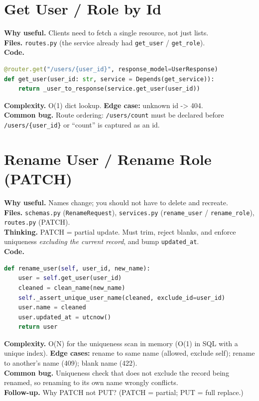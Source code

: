 \documentclass[11pt,a4paper]{report}
\begin{document}
\section{Get User / Role by Id}
\textbf{Why useful.} Clients need to fetch a single resource, not just lists.\\
\textbf{Files.} \texttt{routes.py} (the service already had \texttt{get\_user} /
\texttt{get\_role}).\\
\textbf{Code.}
\begin{lstlisting}[language=Python]
@router.get("/users/{user_id}", response_model=UserResponse)
def get_user(user_id: str, service = Depends(get_service)):
    return _user_to_response(service.get_user(user_id))
\end{lstlisting}
\textbf{Complexity.} O(1) dict lookup. \textbf{Edge case:} unknown id -> 404.\\
\textbf{Common bug.} Route ordering: \texttt{/users/count} must be declared before
\texttt{/users/\{user\_id\}} or ``count'' is captured as an id.

\section{Rename User / Rename Role (PATCH)}
\textbf{Why useful.} Names change; you should not have to delete and recreate.\\
\textbf{Files.} \texttt{schemas.py} (\texttt{RenameRequest}), \texttt{services.py}
(\texttt{rename\_user} / \texttt{rename\_role}), \texttt{routes.py} (PATCH).\\
\textbf{Thinking.} PATCH = partial update. Must trim, reject blanks, and enforce
uniqueness \emph{excluding the current record}, and bump \texttt{updated\_at}.\\
\textbf{Code.}
\begin{lstlisting}[language=Python]
def rename_user(self, user_id, new_name):
    user = self.get_user(user_id)
    cleaned = clean_name(new_name)
    self._assert_unique_user_name(cleaned, exclude_id=user_id)
    user.name = cleaned
    user.updated_at = utcnow()
    return user
\end{lstlisting}
\textbf{Complexity.} O(N) for the uniqueness scan in memory (O(1) in SQL with a
unique index). \textbf{Edge cases:} rename to same name (allowed, exclude self);
rename to another's name (409); blank name (422).\\
\textbf{Common bug.} Uniqueness check that does not exclude the record being
renamed, so renaming to its own name wrongly conflicts.\\
\textbf{Follow-up.} Why PATCH not PUT? (PATCH = partial; PUT = full replace.)
\end{document}
